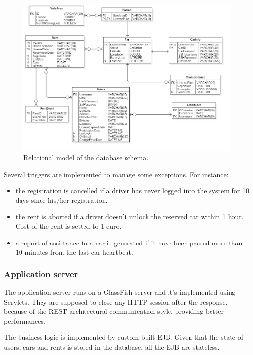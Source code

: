 \begin{figure}[H]
	\centering
	\includegraphics[width=\textwidth, keepaspectratio]{diagrams/Relational.png}
	\caption{Relational model of the database schema.}
	\label {fig:relational}
\end{figure}

Several triggers are implemented to manage some exceptions. For instance:
\begin{itemize}
	\item the registration is cancelled if a driver has never logged into the system for 10 days since his/her registration.
	\item the rent is aborted if a driver doesn't unlock the reserved car within 1 hour. Cost of the rent is setted to 1 euro.
	\item a report of assistance to a car is generated if it have been passed more than 10 minutes from the last car heartbeat.
\end{itemize}

\subsubsection{Application server}

The application server runs on a GlassFish server and it's implemented using Servlets. They are supposed to close any HTTP session after the response, because of the REST architectural communication style, providing better performances. 

The business logic is implemented by custom-built EJB. Given that the state of users, cars and rents is stored in the database, all the EJB are stateless.


